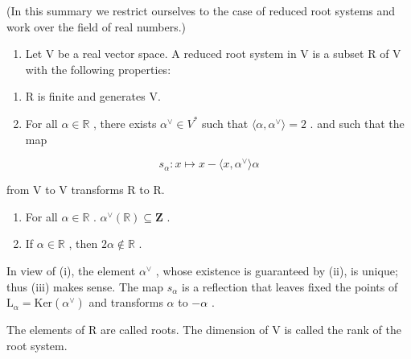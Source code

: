 
(In this summary we restrict ourselves to the case of reduced root systems and work over the field of real numbers.)

\begin{enumerate}
\def\labelenumi{\arabic{enumi})}
\tightlist
\item
  Let V be a real vector space. A reduced root system in V is a subset R of V with the following properties:
\end{enumerate}

\begin{enumerate}
\def\labelenumi{(\roman{enumi})}
\item
  R is finite and generates V.
\item
  For all \(\alpha \in \mathbb{R}\) , there exists \(\alpha^{\vee} \in V^{*}\) such that \(\langle \alpha, \alpha^{\vee} \rangle = 2\) . and such that the map
\end{enumerate}

\[
s _ {\alpha}: x \mapsto x - \langle x, \alpha^{\vee} \rangle \alpha
\]

from V to V transforms R to R.

\begin{enumerate}
\def\labelenumi{(\roman{enumi})}
\setcounter{enumi}{2}
\item
  For all \(\alpha \in \mathbb{R}\) . \(\alpha^{\vee}(\mathbb{R}) \subseteq \mathbf{Z}\) .
\item
  If \(\alpha \in \mathbb{R}\) , then \(2\alpha \notin \mathbb{R}\) .
\end{enumerate}

In view of (i), the element \(\alpha^{\vee}\) , whose existence is guaranteed by (ii), is unique; thus (iii) makes sense. The map \(s_{\alpha}\) is a reflection that leaves fixed the points of \(\mathrm{L}_{\alpha} = \mathrm{Ker}(\alpha^{\vee})\) and transforms \(\alpha\) to \(-\alpha\) .

The elements of R are called roots. The dimension of V is called the rank of the root system.

